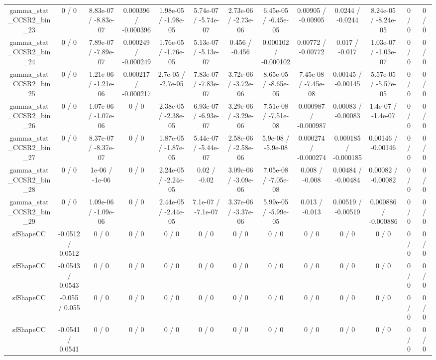 \documentclass[10pt]{article}
\begin{document}
\begin{table}[htbp]
\begin{center}
\begin{tabular}{|c|c|c|c|c|c|c|c|c|c|c|c|c|}
  gamma_stat_CCSR2_bin_23 & 0 / 0 & 8.83e-07 / -8.83e-07 & 0.000396 / -0.000396 & 1.98e-05 / -1.98e-05 & 5.74e-07 / -5.74e-07 & 2.73e-06 / -2.73e-06 & 6.45e-05 / -6.45e-05 & 0.00905 / -0.00905 & 0.0244 / -0.0244 & 8.24e-05 / -8.24e-05 & 0 / 0 & 0 / 0 \\ 
  gamma_stat_CCSR2_bin_24 & 0 / 0 & 7.89e-07 / -7.89e-07 & 0.000249 / -0.000249 & 1.76e-05 / -1.76e-05 & 5.13e-07 / -5.13e-07 & 0.456 / -0.456 & 0.000102 / -0.000102 & 0.00772 / -0.00772 & 0.017 / -0.017 & 1.03e-07 / -1.03e-07 & 0 / 0 & 0 / 0 \\ 
  gamma_stat_CCSR2_bin_25 & 0 / 0 & 1.21e-06 / -1.21e-06 & 0.000217 / -0.000217 & 2.7e-05 / -2.7e-05 & 7.83e-07 / -7.83e-07 & 3.72e-06 / -3.72e-06 & 8.65e-05 / -8.65e-05 & 7.45e-08 / -7.45e-08 & 0.00145 / -0.00145 & 5.57e-05 / -5.57e-05 & 0 / 0 & 0 / 0 \\ 
  gamma_stat_CCSR2_bin_26 & 0 / 0 & 1.07e-06 / -1.07e-06 & 0 / 0 & 2.38e-05 / -2.38e-05 & 6.93e-07 / -6.93e-07 & 3.29e-06 / -3.29e-06 & 7.51e-08 / -7.51e-08 & 0.000987 / -0.000987 & 0.00083 / -0.00083 & 1.4e-07 / -1.4e-07 & 0 / 0 & 0 / 0 \\ 
  gamma_stat_CCSR2_bin_27 & 0 / 0 & 8.37e-07 / -8.37e-07 & 0 / 0 & 1.87e-05 / -1.87e-05 & 5.44e-07 / -5.44e-07 & 2.58e-06 / -2.58e-06 & 5.9e-08 / -5.9e-08 & 0.000274 / -0.000274 & 0.000185 / -0.000185 & 0.00146 / -0.00146 & 0 / 0 & 0 / 0 \\ 
  gamma_stat_CCSR2_bin_28 & 0 / 0 & 1e-06 / -1e-06 & 0 / 0 & 2.24e-05 / -2.24e-05 & 0.02 / -0.02 & 3.09e-06 / -3.09e-06 & 7.05e-08 / -7.05e-08 & 0.008 / -0.008 & 0.00484 / -0.00484 & 0.00082 / -0.00082 & 0 / 0 & 0 / 0 \\ 
  gamma_stat_CCSR2_bin_29 & 0 / 0 & 1.09e-06 / -1.09e-06 & 0 / 0 & 2.44e-05 / -2.44e-05 & 7.1e-07 / -7.1e-07 & 3.37e-06 / -3.37e-06 & 5.99e-05 / -5.99e-05 & 0.013 / -0.013 & 0.00519 / -0.00519 & 0.000886 / -0.000886 & 0 / 0 & 0 / 0 \\ 
  sfShapeCC & -0.0512 / 0.0512 & 0 / 0 & 0 / 0 & 0 / 0 & 0 / 0 & 0 / 0 & 0 / 0 & 0 / 0 & 0 / 0 & 0 / 0 & 0 / 0 & 0 / 0 \\ 
  sfShapeCC & -0.0543 / 0.0543 & 0 / 0 & 0 / 0 & 0 / 0 & 0 / 0 & 0 / 0 & 0 / 0 & 0 / 0 & 0 / 0 & 0 / 0 & 0 / 0 & 0 / 0 \\ 
  sfShapeCC & -0.055 / 0.055 & 0 / 0 & 0 / 0 & 0 / 0 & 0 / 0 & 0 / 0 & 0 / 0 & 0 / 0 & 0 / 0 & 0 / 0 & 0 / 0 & 0 / 0 \\ 
  sfShapeCC & -0.0541 / 0.0541 & 0 / 0 & 0 / 0 & 0 / 0 & 0 / 0 & 0 / 0 & 0 / 0 & 0 / 0 & 0 / 0 & 0 / 0 & 0 / 0 & 0 / 0 \\ 

\end{tabular}
\end{center}
\end{table}
\end{document}
